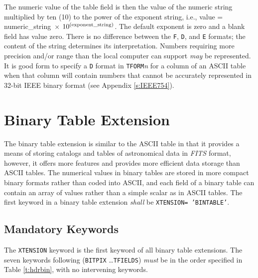 \documentclass[11pt,makeidx]{book}     %
\begin{document}
   The numeric value of the table field is then the value of the numeric
   string multiplied by ten (10) to the power of the exponent string,
   i.e., 
   value = numeric\_string~$\times$ $10^{\rm (exponent\_string)}$.  The
   default exponent is zero and a blank field has value zero.  There is
   no difference between the {\tt F}, {\tt D}, and {\tt E} formats; the
   content of the string determines its interpretation.  Numbers
   requiring more precision and/or range than the local computer can
   support {\em may} be represented.  It is good form to specify a {\tt D}
   format in {\tt TFORM}{\it n} for a column of an ASCII table when that
   column will contain numbers that cannot be accurately represented in
   32-bit IEEE binary format (see Appendix \ref{s:IEEE754}).
    
\newpage

                            
  \section{Binary Table Extension}
     \label{s:BTabl}
     
The binary table extension is similar to the ASCII
table in that it provides a means of storing catalogs and tables of
astronomical data in {\em FITS\/} format, however, it offers more
features and provides more efficient data storage than ASCII tables.
The numerical values in binary tables are stored in more compact 
binary formats rather than coded into ASCII, and each
field of a binary table can contain an array of values rather
than a simple scalar as in ASCII tables.
The first keyword in a binary table extension {\em shall}
be {\tt XTENSION= 'BINTABLE'}.  
   
   \subsection{Mandatory Keywords}
       \label{s:btmk}

   The {\tt XTENSION} keyword is the first keyword of all binary
   table extensions.  The seven keywords
   following ({\tt BITPIX} \ldots {\tt TFIELDS})
   {\em must} be in the order specified in Table \ref{t:hdrbin}, with no
   intervening keywords.    
\end{document}
